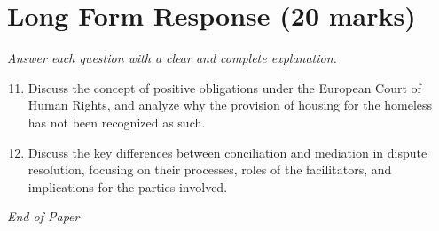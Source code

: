 \documentclass[12pt]{article}
\begin{document}
\section*{Long Form Response (20 marks)}
\textit{Answer each question with a clear and complete explanation.}
\begin{enumerate}[label=\arabic*.]
\setcounter{enumi}{10}
\item Discuss the concept of positive obligations under the European Court of Human Rights, and analyze why the provision of housing for the homeless has not been recognized as such.
\item Discuss the key differences between conciliation and mediation in dispute resolution, focusing on their processes, roles of the facilitators, and implications for the parties involved.
\end{enumerate}

\vfill
\noindent\textit{End of Paper}
\end{document}
